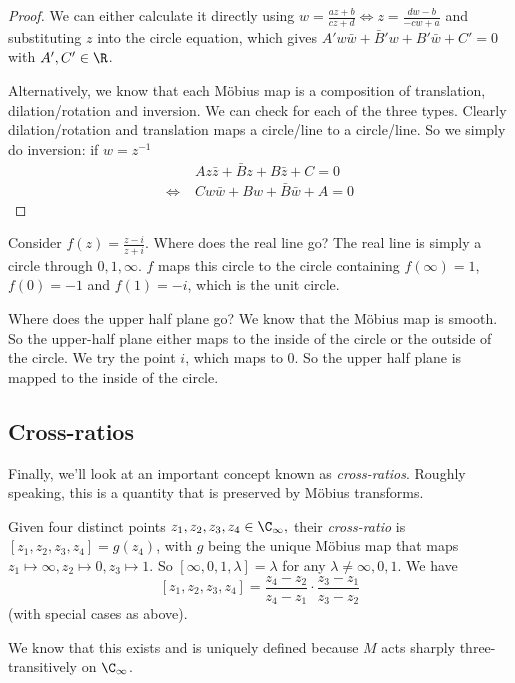 \documentclass[a4paper]{article}
\begin{document}
\begin{proof}
  We can either calculate it directly using $w = \frac{az + b}{cz + d}\Leftrightarrow z = \frac{dw - b}{-cw + a}$ and substituting $z$ into the circle equation, which gives $A' w\bar w + \bar B' w + B'\bar w + C' = 0$ with $A', C'\in \R$.

  Alternatively, we know that each M\"obius map is a composition of translation, dilation/rotation and inversion. We can check for each of the three types. Clearly dilation/rotation and translation maps a circle/line to a circle/line. So we simply do inversion: if $w = z^{-1}$
  \begin{align*}
    &\; Az\bar z + \bar Bz + B\bar z + C = 0\\
    \Leftrightarrow &\;  Cw\bar w + Bw + \bar B\bar w + A = 0
  \end{align*}
\end{proof}

\begin{eg}
  Consider $f(z) = \frac{z - i}{z + i}$. Where does the real line go? The real line is simply a circle through $0, 1, \infty$. $f$ maps this circle to the circle containing $f(\infty) = 1$, $f(0) = -1$ and $f(1) = -i$, which is the unit circle.

  Where does the upper half plane go? We know that the M\"obius map is smooth. So the upper-half plane either maps to the inside of the circle or the outside of the circle. We try the point $i$, which maps to $0$. So the upper half plane is mapped to the inside of the circle.
\end{eg}
\subsection{Cross-ratios}
  Finally, we'll look at an important concept known as \emph{cross-ratios}. Roughly speaking, this is a quantity that is preserved by M\"obius transforms.

\begin{defi}
  Given four distinct points $z_1, z_2, z_3, z_4\in \C_\infty,$ their \emph{cross-ratio} is $[z_1, z_2, z_3, z_4] = g(z_4)$, with $g$ being the unique M\"obius map that maps $z_1\mapsto \infty, z_2\mapsto 0, z_3\mapsto 1$.  So $[\infty, 0, 1, \lambda] = \lambda$ for any $\lambda\not= \infty, 0, 1$. We have
  \[
    [z_1, z_2, z_3, z_4] = \frac{z_4 - z_2}{z_4 - z_1} \cdot \frac{z_3 - z_1}{z_3 - z_2}
  \]
  (with special cases as above).
\end{defi}
We know that this exists and is uniquely defined because $M$ acts sharply three-transitively on $\C_\infty$.
\end{document}
